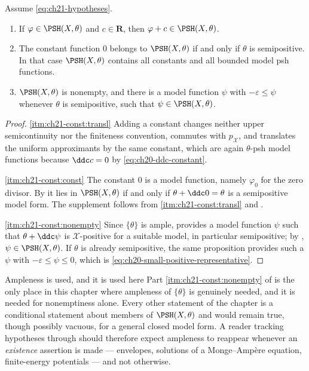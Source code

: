 \begin{proposition}
\label{prop:ch21-constants}
Assume \eqref{eq:ch21-hypotheses}.
\begin{enumerate}
\item\label{itm:ch21-const:transl}
If \(\varphi\in\PSH(X,\theta)\) and \(c\in\mathbf R\), then
\(\varphi+c\in\PSH(X,\theta)\).
\item\label{itm:ch21-const:const}
The constant function \(0\) belongs to \(\PSH(X,\theta)\) if and only if
\(\theta\) is semipositive.  In that case \(\PSH(X,\theta)\) contains all
constants and all bounded model psh functions.
\item\label{itm:ch21-const:nonempty}
\(\PSH(X,\theta)\) is nonempty, and there is a model function \(\psi\) with
\(-\varepsilon\leq\psi\) whenever \(\theta\) is semipositive, such that
\(\psi\in\PSH(X,\theta)\).
\end{enumerate}
\end{proposition}

\begin{proof}
\cref{itm:ch21-const:transl}  Adding a constant changes neither upper
semicontinuity nor the finiteness convention, commutes with
\(p_{\mathcal X}\), and translates the uniform approximants by the same
constant, which are again \(\theta\)-psh model functions because
\(\ddc c=0\) by \eqref{eq:ch20-ddc-constant}.

\cref{itm:ch21-const:const}  The constant \(0\) is a model function, namely
\(\varphi_0\) for the zero divisor.  By
 it lies in \(\PSH(X,\theta)\) if and only
if \(\theta+\ddc0=\theta\) is a semipositive model form.  The supplement
follows from \cref{itm:ch21-const:transl} and
.

\cref{itm:ch21-const:nonempty}  Since \(\{\theta\}\) is ample,
 provides a model function \(\psi\)
such that \(\theta+\ddc\psi\) is \(\mathcal X\)-positive for a suitable
model, in particular semipositive; by
, \(\psi\in\PSH(X,\theta)\).  If
\(\theta\) is already semipositive, the same proposition provides such a
\(\psi\) with \(-\varepsilon\leq\psi\leq0\), which is
\eqref{eq:ch20-small-positive-representative}.
\end{proof}

\begin{warning}{Ampleness is used, and it is used here}
Part \cref{itm:ch21-const:nonempty} of
 is the only place in this chapter where
ampleness of \(\{\theta\}\) is genuinely needed, and it is needed for
nonemptiness alone.  Every other statement of the chapter is a conditional
statement about members of \(\PSH(X,\theta)\) and would remain true, though
possibly vacuous, for a general closed model form.  A reader tracking
hypotheses through  should therefore expect ampleness to
reappear whenever an \emph{existence} assertion is made --- envelopes,
solutions of a Monge--Amp\`ere equation, finite-energy potentials --- and
not otherwise.
\end{warning}

